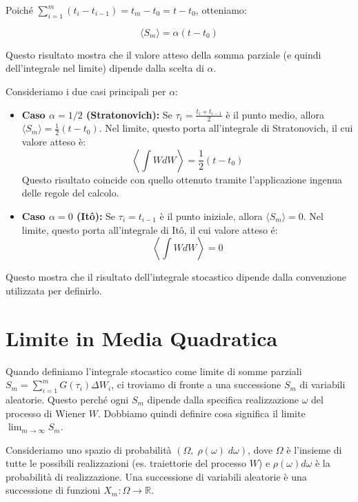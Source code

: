 Poiché $\sum_{i=1}^m (t_i - t_{i-1}) = t_m - t_0 = t - t_0$, otteniamo:


\begin{equation}
\langle S_m \rangle = \alpha (t-t_0)
\end{equation}




\begin{tcolorbox}[colback=colorF!5,colframe=colorF, title=Attenzione]
Questo risultato mostra che il valore atteso della somma parziale (e quindi dell'integrale nel limite) dipende dalla scelta di $\alpha$.
\end{tcolorbox}

Consideriamo i due casi principali per $\alpha$:
\begin{itemize}
    \item \textbf{Caso $\alpha = 1/2$ (Stratonovich):} Se $\tau_i = \frac{t_i + t_{i-1}}{2}$ è il punto medio, allora $\langle S_m \rangle = \frac{1}{2}(t-t_0)$. Nel limite, questo porta all'integrale di Stratonovich, il cui valore atteso è:       
$$
       \left \langle \int W dW \right \rangle= \frac{1}{2}(t-t_0) 
$$
Questo risultato coincide con quello ottenuto tramite l'applicazione ingenua delle regole del calcolo.
    \item \textbf{Caso $\alpha = 0$ (Itô):} Se $\tau_i = t_{i-1}$ è il punto iniziale, allora $\langle S_m \rangle = 0$. Nel limite, questo porta all'integrale di Itô, il cui valore atteso é: 
    $$
\left \langle \int W dW \right \rangle= 0
$$
\end{itemize}
Questo mostra che il risultato dell'integrale stocastico dipende dalla convenzione utilizzata per definirlo.


\section{Limite in Media Quadratica}
Quando definiamo l'integrale stocastico come limite di somme parziali $S_m = \sum_{i=1}^{m} G(\tau_i) \Delta W_i$, ci troviamo di fronte a una successione $S_m$ di variabili aleatorie. Questo perché ogni $S_m$ dipende dalla specifica realizzazione $\omega$ del processo di Wiener $W$. Dobbiamo quindi definire cosa significa il limite $\lim_{m\to\infty} S_m$.

Consideriamo uno spazio di probabilità $(\Omega, \; \rho(\omega)\; d\omega)$, dove $\Omega$ è l'insieme di tutte le possibili realizzazioni (es. traiettorie del processo $W$) e  $\rho(\omega) d\omega$  è la probabilità di realizzazione. Una successione di variabili aleatorie è una successione di funzioni $X_m: \Omega \to \mathbb{R}$.

